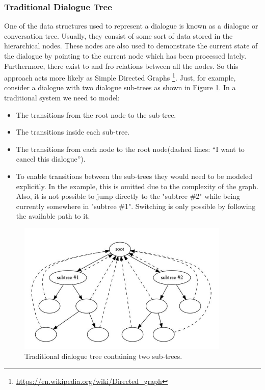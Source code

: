 \subsubsection*{Traditional Dialogue Tree}
One of the data structures used to represent a dialogue is known as a dialogue or conversation tree. Usually, they consist of some sort of data stored in the hierarchical nodes. These nodes are also used to demonstrate the current state of the dialogue by pointing to the current node which has been processed lately. Furthermore, there exist to and fro relations between all the nodes. So this approach acts more likely as Simple Directed Graphs \footnote{\url{https://en.wikipedia.org/wiki/Directed\_graph}}. Just, for example, consider a dialogue with two dialogue sub-trees as shown in Figure \ref{fig:modArch}. In a traditional system we need to model:
\begin{itemize}
\item The transitions from the root node to the sub-tree.
\item The transitions inside each sub-tree.       
\item The transitions from each node to the root node(dashed lines: “I want to cancel this dialogue”).
\item To enable transitions between the sub-trees they would need to be modeled explicitly. In the example, this is omitted due to the complexity of the graph. Also, it is not possible to jump directly to the "subtree \#2" while being currently somewhere in "subtree \#1". Switching is only possible by following the available path to it.
\end{itemize} 

\begin{figure}[!h]
    \centering
    \includegraphics[width=0.9\textwidth]{img/Modular_Architecture.PNG}
    \caption{Traditional dialogue tree containing two sub-trees.}
    \label{fig:modArch}
\end{figure}


